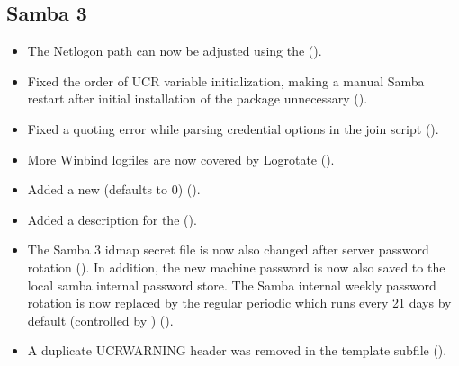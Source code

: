 \subsection{Samba 3}
\begin{itemize}
\item The Netlogon path can now be adjusted using the
   ().
\item Fixed the order of UCR variable initialization, making a manual
  Samba restart after initial installation of the
   package unnecessary ().
\item Fixed a quoting error while parsing credential options in the
  join script ().
\item More Winbind logfiles are now covered by Logrotate ().
\item Added a new  (defaults to 0) ().
\item Added a description for the  ().
\item The Samba 3 idmap secret file is now also changed after server
  password rotation (). In addition, the new machine
  password is now also saved to the local samba internal password store.
  The Samba internal weekly password rotation is now replaced by the regular
  periodic  which runs every 21 days by default
  (controlled by ) ().
\item A duplicate UCRWARNING header was removed in the
   template subfile ().
\end{itemize}

